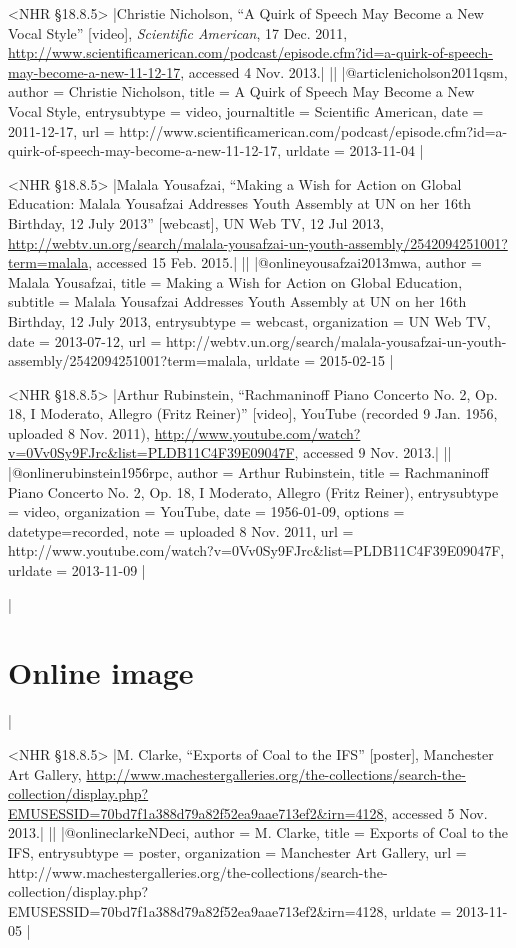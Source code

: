 \documentclass[extrafontsizes,11pt,a4paper,oneside]{memoir}
\begin{document}
\bibexample<NHR \S18.8.5>
|Christie Nicholson, \enquote{A Quirk of Speech May Become a New Vocal Style} [video], \emph{Scientific American}, 17 Dec. 2011, \url{http://www.scientificamerican.com/podcast/episode.cfm?id=a-quirk-of-speech-may-become-a-new-11-12-17}, accessed 4 Nov. 2013.|%
||
|@article{nicholson2011qsm,
  author = {Christie Nicholson},
  title = {A Quirk of Speech May Become a New Vocal Style},
  entrysubtype = {video},
  journaltitle = {Scientific American},
  date = {2011-12-17},
  url = {http://www.scientificamerican.com/podcast/episode.cfm?id=a-quirk-of-speech-may-become-a-new-11-12-17},
  urldate = {2013-11-04}
}|

\bibexample<NHR \S18.8.5>
|Malala Yousafzai, \enquote{Making a Wish for Action on Global Education: Malala Yousafzai Addresses Youth Assembly at UN on her 16th Birthday, 12 July 2013} [webcast], UN Web TV, 12 Jul 2013, \url{http://webtv.un.org/search/malala-yousafzai-un-youth-assembly/2542094251001?term=malala}, accessed 15 Feb. 2015.|%
||%
|@online{yousafzai2013mwa,
  author = {Malala Yousafzai},
  title = {Making a Wish for Action on Global Education},
  subtitle = {Malala Yousafzai Addresses Youth Assembly at UN on her 16th Birthday, 12 July 2013},
  entrysubtype = {webcast},
  organization = {UN Web TV},
  date = {2013-07-12},
  url = {http://webtv.un.org/search/malala-yousafzai-un-youth-assembly/2542094251001?term=malala},
  urldate = {2015-02-15}
}|

\bibexample<NHR \S18.8.5>
|Arthur Rubinstein, \enquote{Rachmaninoff Piano Concerto No. 2, Op. 18, I Moderato, Allegro (Fritz Reiner)} [video], YouTube (recorded 9 Jan. 1956, uploaded 8 Nov. 2011), \url{http://www.youtube.com/watch?v=0Vv0Sy9FJrc&list=PLDB11C4F39E09047F}, accessed 9 Nov. 2013.|%
||%
|@online{rubinstein1956rpc,
  author = {Arthur Rubinstein},
  title = {Rachmaninoff Piano Concerto No. 2, Op. 18, I Moderato, Allegro (Fritz Reiner)},
  entrysubtype = {video},
  organization = {YouTube},
  date = {1956-01-09},
  options = {datetype={recorded}},
  note = {uploaded 8 Nov. 2011},
  url = {http://www.youtube.com/watch?v=0Vv0Sy9FJrc&list=PLDB11C4F39E09047F},
  urldate = {2013-11-09}
}|

\todoc|
\section{Online image}
|

\bibexample<NHR \S18.8.5>
|M. Clarke, \enquote{Exports of Coal to the IFS} [poster], Manchester Art Gallery, \url{http://www.machestergalleries.org/the-collections/search-the-collection/display.php?EMUSESSID=70bd7f1a388d79a82f52ea9aae713ef2&irn=4128}, accessed 5 Nov. 2013.|%
||%
|@online{clarkeNDeci,
  author = {M. Clarke},
  title = {Exports of Coal to the IFS},
  entrysubtype = {poster},
  organization = {Manchester Art Gallery},
  url = {http://www.machestergalleries.org/the-collections/search-the-collection/display.php?EMUSESSID=70bd7f1a388d79a82f52ea9aae713ef2&irn=4128},
  urldate = {2013-11-05}
}|
\end{document}
